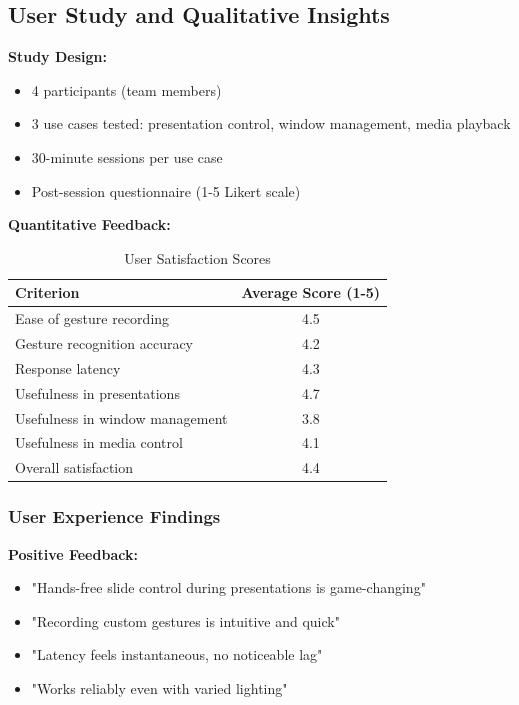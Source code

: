 \documentclass[11pt,a4paper]{article}
\begin{document}
\subsection{User Study and Qualitative Insights}

\textbf{Study Design:}
\begin{itemize}
\item 4 participants (team members)
\item 3 use cases tested: presentation control, window management, media playback
\item 30-minute sessions per use case
\item Post-session questionnaire (1-5 Likert scale)
\end{itemize}

\textbf{Quantitative Feedback:}
\begin{table}[H]
\centering
\begin{tabular}{@{}lc@{}}
\toprule
\textbf{Criterion} & \textbf{Average Score (1-5)} \\
\midrule
Ease of gesture recording & 4.5 \\
Gesture recognition accuracy & 4.2 \\
Response latency & 4.3 \\
Usefulness in presentations & 4.7 \\
Usefulness in window management & 3.8 \\
Usefulness in media control & 4.1 \\
Overall satisfaction & 4.4 \\
\bottomrule
\end{tabular}
\caption{User Satisfaction Scores}
\end{table}

\subsubsection{User Experience Findings}

\textbf{Positive Feedback:}
\begin{itemize}
\item "Hands-free slide control during presentations is game-changing"
\item "Recording custom gestures is intuitive and quick"
\item "Latency feels instantaneous, no noticeable lag"
\item "Works reliably even with varied lighting"
\end{itemize}
\end{document}
